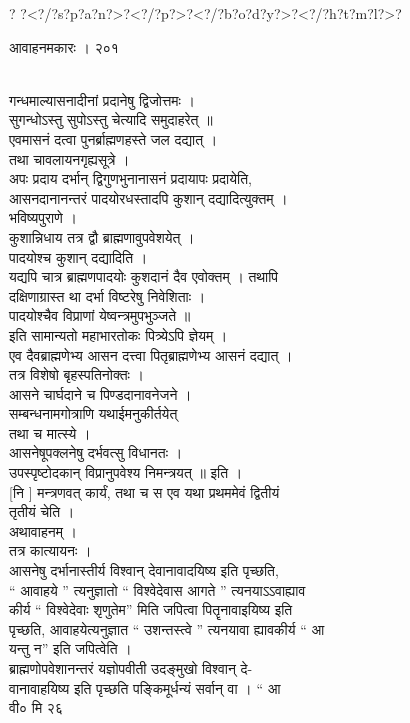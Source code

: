 \documentclass[11pt, openany]{book}
\begin{document}
{{{{{{{?
?\textless{}?/?s?p?a?n?\textgreater{}?\textless{}?/?p?\textgreater{}?\textless{}?/?b?o?d?y?\textgreater{}?\textless{}?/?h?t?m?l?\textgreater{}?

{आवाहनमकारः । २०१}{\\
गन्धमाल्यासनादीनां प्रदानेषु द्विजोत्तमः ।\\
सुगन्धोऽस्तु सुपोऽस्तु चेत्यादि समुदाहरेत् ॥\\
एवमासनं दत्वा पुनर्ब्राह्मणहस्ते जल दद्यात् ।\\
तथा चावलायनगृह्यसूत्रे ।\\
अपः प्रदाय दर्भान् द्विगुणभुनानासनं प्रदायापः प्रदायेति,\\
आसनदानानन्तरं पादयोरधस्तादपि कुशान् दद्यादित्युक्तम् ।\\
भविष्यपुराणे ।\\
कुशान्निधाय तत्र द्वौ ब्राह्मणावुपवेशयेत् ।\\
पादयोश्च कुशान् दद्यादिति ।\\
यद्यपि चात्र ब्राह्मणपादयोः कुशदानं दैव एवोक्तम् । तथापि\\
दक्षिणाग्रास्त था दर्भा विष्टरेषु निवेशिताः ।\\
पादयोश्चैव विप्राणां येष्वन्त्रमुपभुञ्जते ॥\\
इति सामान्यतो महाभारतोकः पित्र्येऽपि ज्ञेयम् ।\\
एव दैवब्राह्मणेभ्य आसन दत्त्वा पितृब्राह्मणेभ्य आसनं दद्यात् ।\\
तत्र विशेषो बृहस्पतिनोक्तः ।\\
आसने चार्घदाने च पिण्डदानावनेजने ।\\
सम्बन्धनामगोत्राणि यथाईमनुकीर्तयेत् \textbar{}\textbar{}\\
तथा च मात्स्ये ।\\
आसनेषूपक्लनेषु दर्भवत्सु विधानतः ।\\
उपस्पृष्टोदकान् विप्रानुपवेश्य निमन्त्रयत् ॥ इति ।\\
{[}नि {]} मन्त्रणवत् कार्यं, तथा च स एव यथा प्रथममेवं द्वितीयं\\
तृतीयं चेति ।\\
अथावाहनम् ।\\
तत्र कात्यायनः ।\\
आसनेषु दर्भानास्तीर्य विश्वान् देवानावादयिष्य इति पृच्छति,\\
`` आवाहये '' त्यनुज्ञातो `` विश्वेदेवास आगते '' त्यनयाऽऽवाह्याव\\
कीर्य `` विश्वेदेवाः शृणुतेम'' मिति जपित्वा पितॄनावाइयिष्य इति\\
पृच्छति, आवाहयेत्यनुज्ञात `` उशन्तस्त्वे '' त्यनयावा ह्यावकीर्य `` आ\\
यन्तु न'' इति जपित्वेति ।\\
ब्राह्मणोपवेशानन्तरं यज्ञोपवीती उदङ्मुखो विश्वान् दे-\\
वानावाहयिष्य इति पृच्छति पङ्किमूर्धन्यं सर्वान् वा । `` आ\\
वी० मि २६ 

}}}}}}}}
\end{document}
